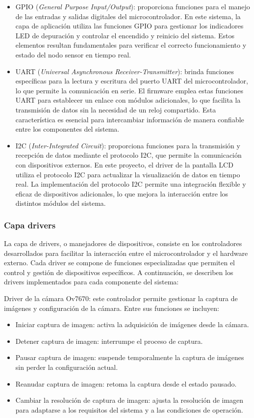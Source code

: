 \begin{itemize}
\item GPIO (\textit{General Purpose Input/Output}): proporciona funciones para el manejo de las entradas y salidas digitales del microcontrolador. En este sistema, la capa de aplicación utiliza las funciones GPIO para gestionar los indicadores LED de depuración y controlar el encendido y reinicio del sistema. Estos elementos resultan fundamentales para verificar el correcto funcionamiento y estado del nodo sensor en tiempo real.
\item UART (\textit{Universal Asynchronous Receiver-Transmitter}): brinda funciones específicas para la lectura y escritura del puerto UART del microcontrolador, lo que permite la comunicación en serie. El firmware emplea estas funciones UART para establecer un enlace con módulos adicionales, lo que facilita la transmisión de datos sin la necesidad de un reloj compartido. Esta característica es esencial para intercambiar información de manera confiable entre los componentes del sistema.
\item I2C (\textit{Inter-Integrated Circuit}): proporciona funciones para la transmisión y recepción de datos mediante el protocolo I2C, que permite la comunicación con dispositivos externos. En este proyecto, el driver de la pantalla LCD utiliza el protocolo I2C para actualizar la visualización de datos en tiempo real. La implementación del protocolo I2C permite una integración flexible y eficaz de dispositivos adicionales, lo que mejora la interacción entre los distintos módulos del sistema.
\end{itemize}

\subsubsection{Capa drivers}
\label{Capa_drivers}

La capa de drivers, o manejadores de dispositivos, consiste en los controladores desarrollados para facilitar la interacción entre el microcontrolador y el hardware externo. Cada driver se compone de funciones especializadas que permiten el control y gestión de dispositivos específicos. A continuación, se describen los drivers implementados para cada componente del sistema:

Driver de la cámara Ov7670: este controlador permite gestionar la captura de imágenes y configuración de la cámara. Entre sus funciones se incluyen:
\begin{itemize}
\item Iniciar captura de imagen: activa la adquisición de imágenes desde la cámara.
\item Detener captura de imagen: interrumpe el proceso de captura.
\item Pausar captura de imagen: suspende temporalmente la captura de imágenes sin perder la configuración actual.
\item Reanudar captura de imagen: retoma la captura desde el estado pausado.
\item Cambiar la resolución de captura de imagen: ajusta la resolución de imagen para adaptarse a los requisitos del sistema y a las condiciones de operación.
\end{itemize}

